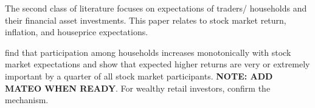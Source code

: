 \documentclass[ProjectABM]{subfiles}
\begin{document}




The second class of literature focuses on expectations of traders/ households and their financial asset investments. This paper relates to stock market return, inflation, and houseprice expectations.

\cite{arrondel_et_al_2014subjective_return_expectation} find that participation among households increases monotonically with stock market expectations and \cite{choi_2020} show that expected higher returns are very or extremely important by a quarter of all stock market participants. \textbf{NOTE: ADD MATEO WHEN READY}. For wealthy retail investors, \cite{giglio_et_al_2019five} confirm the mechanism.
\end{document}
